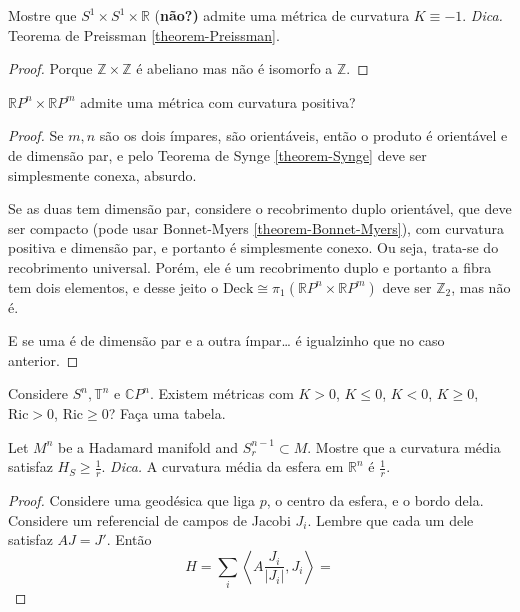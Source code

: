 \documentclass{book}
\begin{document}
\begin{exercise}
\label{exercise-S1xS1xR-admite-curvatura--1}
Mostre que $S^1 \times S^1 \times \mathbb{R}$
{(\bf não?)} admite uma métrica de
 curvatura $K\equiv-1$. {\it Dica.} Teorema
 de Preissman
\ref{theorem-Preissman}.
\end{exercise}

\begin{proof}
Porque $\mathbb{Z} \times \mathbb{Z}$ é
abeliano mas não é isomorfo a
$\mathbb{Z}$.
\end{proof}

\begin{exercise}
\label{exercise-rpnxr-admit-curva-posit}
$\mathbb{R}P^{n}\times \mathbb{R}P^{m}$
admite uma métrica com
curvatura positiva?
\end{exercise}

\begin{proof}
Se $m,n$ são os dois ímpares, são
orientáveis, então o produto é orientável e
de
dimensão par, e pelo Teorema de Synge
\ref{theorem-Synge} deve ser
simplesmente conexa, absurdo.

Se as duas tem dimensão par, considere o
recobrimento duplo orientável, que deve
ser compacto (pode usar Bonnet-Myers
\ref{theorem-Bonnet-Myers}), com curvatura
positiva e dimensão par, e portanto é
simplesmente conexo. Ou seja, trata-se do
recobrimento universal. Porém, ele é um
recobrimento duplo e portanto a fibra
tem dois elementos, e desse jeito o
$\text{Deck}\cong
\pi_{1}(\mathbb{R}P^{n}\times\mathbb{R}P^{m})
$
deve ser $\mathbb{Z}_2$,
mas não é.

E se uma é de dimensão par e a outra ímpar… é
igualzinho que no caso anterior.
\end{proof}

\begin{exercise}
\label{exercise-Sn-Tn-CPn-existem-curvaturas}
Considere $S^n,\mathbb{T}^n$ e
$\mathbb{C}P^{n}$. Existem métricas com
$K>0$, $K
\leq 0$, $K<0$, $K \geq 0$, $\text{Ric}>0$,
$\text{Ric} \geq 0$? Faça uma
tabela.
\end{exercise}

\begin{exercise}
\label{exercise-Hadamard-manifold-sphere}
Let $M^n$ be a Hadamard manifold and
$S^{n-1}_r \subset M$. Mostre que
 a curvatura média satisfaz $H_S\geq
 \frac{1}{r}$. {\it Dica.} A curvatura média
da esfera em $\mathbb{R}^n$ é $\frac{1}{r}$.
\end{exercise}

\begin{proof}
Considere uma geodésica que liga $p$, o
centro da esfera, e o bordo dela.
Considere um referencial de campos de Jacobi
$J_i$. Lembre que cada um dele
satisfaz $A J=J'$. Então
$$
H=\sum_{i}\left\langle{}A
\frac{J_i}{|J_i|},J_i\right\rangle{}=
$$
\end{proof}
\end{document}

